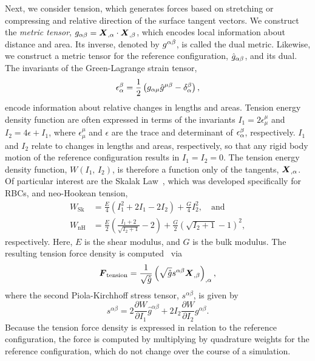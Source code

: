 Next, we consider tension, which generates forces based on stretching or compressing
and relative direction of the surface tangent vectors. We construct the \emph{metric
tensor}, $g_{\alpha\beta} = \boldsymbol{X}_{,\alpha}\cdot\boldsymbol{X}_{,\beta}$, which encodes local
information about distance and area. Its inverse, denoted by $g^{\alpha\beta}$, is
called the dual metric.  Likewise, we construct a metric tensor for the reference
configuration, $\hat{g}_{\alpha\beta}$, and its dual. The invariants of the
Green-Lagrange strain tensor,
\begin{equation}
    \epsilon_\alpha^\beta = \frac12\left(g_{\alpha\mu}\hat{g}^{\mu\beta}-\delta_\alpha^\beta\right),
\end{equation}
encode information about relative changes in lengths and areas. Tension energy density
function are often expressed in terms of the invariants $I_1 = 2\epsilon_\mu^\mu$ and
$I_2 = 4\epsilon + I_1$, where $\epsilon_\mu^\mu$ and $\epsilon$ are the trace and
determinant of $\epsilon_\alpha^{\smash\beta}$, respectively. $I_1$ and $I_2$ relate to
changes in lengths and areas, respectively, so that any rigid body motion of the
reference configuration results in $I_1 = I_2 = 0$. The tension energy density function,
$W(I_1,\,I_2)$, is therefore a function only of the tangents, $\boldsymbol{X}_{,\alpha}$. Of
particular interest are the Skalak Law~\cite{Skalak:1973tp}, which was developed
specifically for RBCs, and neo-Hookean tension,
\begin{align}
    W_\text{Sk} &= \frac{E}{4}\left(I_1^2 + 2I_1 - 2I_2\right) + \frac{G}4 I_2^2, \quad\text{and} \\
    W_\text{nH} &= \frac{E}{2}\left(\frac{I_1+2}{\sqrt{I_2+1}}-2\right) + \frac{G}2 \left(\sqrt{I_2+1}-1\right)^2,
\end{align}
respectively. Here, $E$ is the shear modulus, and $G$ is the bulk modulus. The resulting
tension force density is computed~\cite{Maxian:2018ek} via
\begin{equation}\label{eq:tension-force}
    \boldsymbol{F}_\text{tension} = \frac{1}{\sqrt{\hat{g}}}\left(\sqrt{\hat{g}}s^{\alpha\beta}\boldsymbol{X}_{,\beta}\right)_{,\alpha},
\end{equation}
where the second Piola-Kirchhoff stress tensor, $s^{\alpha\beta}$, is given by
\begin{equation}
    s^{\alpha\beta} = 2\frac{\partial W}{\partial I_1} \hat{g}^{\alpha\beta} + 2I_2\frac{\partial W}{\partial I_2} g^{\alpha\beta}.
\end{equation}
Because the tension force density is expressed in relation to the reference
configuration, the force is computed by multiplying by quadrature weights for the
reference configuration, which do not change over the course of a simulation.

